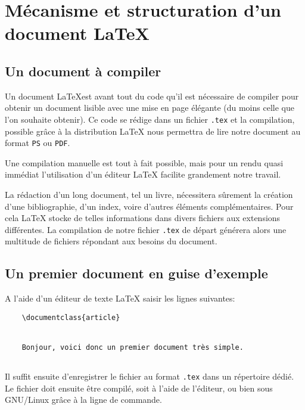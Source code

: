 
\chapter{Mécanisme et structuration d'un document \LaTeX}
\section{Un document à compiler}
Un document \LaTeX est avant tout du code qu'il est nécessaire de compiler pour obtenir un document lisible avec une mise en page élégante (du moins celle que l'on souhaite obtenir). Ce code se rédige dans un fichier \texttt{.tex} et la compilation, possible grâce à la distribution \LaTeX{} nous permettra de lire notre document au format \texttt{PS} ou \texttt{PDF}.
\medskip

Une compilation manuelle est tout à fait possible, mais pour un rendu quasi immédiat l'utilisation d'un éditeur \LaTeX{} facilite grandement notre travail.
\medskip

La rédaction d'un long document, tel un livre, nécessitera sûrement la création d'une bibliographie, d'un index, voire d'autres éléments complémentaires. Pour cela \LaTeX{} stocke de telles informations dans divers fichiers aux extensions différentes. La compilation de notre fichier \texttt{.tex} de départ générera alors une multitude de fichiers répondant aux besoins du document. 
\medskip

\section{Un premier document en guise d'exemple}
A l'aide d'un éditeur de texte \LaTeX{} saisir les lignes suivantes:
\begin{verbatim}
    \documentclass{article}
    
    
    Bonjour, voici donc un premier document très simple.
    
\end{verbatim}
\medskip	

Il suffit ensuite d'enregistrer le fichier au format \texttt{.tex} dans un répertoire dédié. Le fichier doit ensuite être compilé, soit à l'aide de l'éditeur, ou bien sous GNU/Linux grâce à la ligne de commande. 
\medskip


